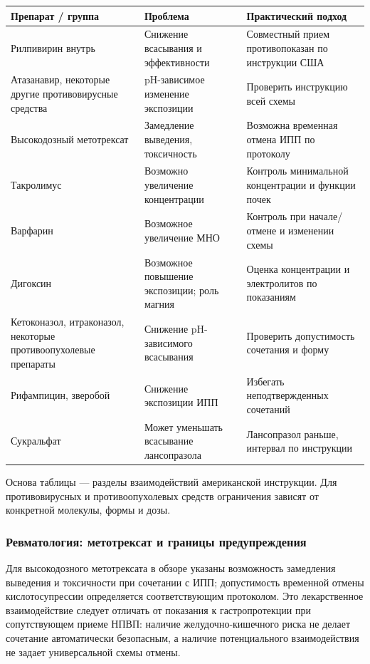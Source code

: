 \documentclass[11pt,a4paper,notitlepage]{report}
\newcommand{\src}[1]{\unskip\space\cite{#1}}
\begin{document}
\begin{longtable}{P{0.29\textwidth}P{0.33\textwidth}P{0.29\textwidth}}
\toprule
Препарат / группа & Проблема & Практический подход \\
\midrule
\endhead
Рилпивирин внутрь & Снижение всасывания и эффективности & Совместный прием противопоказан по инструкции США \\
Атазанавир, некоторые другие противовирусные средства & pH-зависимое изменение экспозиции & Проверить инструкцию всей схемы \\
Высокодозный метотрексат & Замедление выведения, токсичность & Возможна временная отмена ИПП по протоколу \\
Такролимус & Возможно увеличение концентрации & Контроль минимальной концентрации и функции почек \\
Варфарин & Возможное увеличение МНО & Контроль при начале/отмене и изменении схемы \\
Дигоксин & Возможное повышение экспозиции; роль магния & Оценка концентрации и электролитов по показаниям \\
Кетоконазол, итраконазол, некоторые противоопухолевые препараты & Снижение pH-зависимого всасывания & Проверить допустимость сочетания и форму \\
Рифампицин, зверобой & Снижение экспозиции ИПП & Избегать неподтвержденных сочетаний \\
Сукральфат & Может уменьшать всасывание лансопразола & Лансопразол раньше, интервал по инструкции \\
\bottomrule
\end{longtable}
Основа таблицы --- разделы взаимодействий американской инструкции. Для противовирусных и противоопухолевых средств ограничения зависят от конкретной молекулы, формы и дозы.\src{uslabel}

\subsubsection{Ревматология: метотрексат и границы предупреждения}
Для высокодозного метотрексата в обзоре указаны возможность замедления выведения и токсичности при сочетании с ИПП; допустимость временной отмены кислотосупрессии определяется соответствующим протоколом. Это лекарственное взаимодействие следует отличать от показания к гастропротекции при сопутствующем приеме НПВП: наличие желудочно-кишечного риска не делает сочетание автоматически безопасным, а наличие потенциального взаимодействия не задает универсальной схемы отмены.\src{uslabel,nice}
\end{document}
